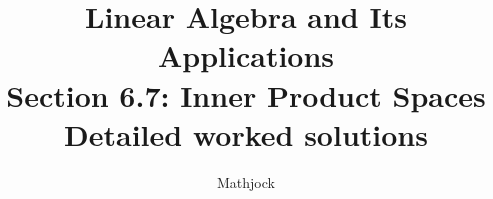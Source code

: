 
\title{\textbf{Linear Algebra and Its Applications}\\[0.3em]Section 6.7: Inner Product Spaces\\[0.3em]\large Detailed worked solutions}
\author{Mathjock}
\date{}

\maketitle
\bookinfo
\tableofcontents
\clearpage
\renewcommand{\thesection}{6.\arabic{section}}
\renewcommand{\theHsection}{6.\arabic{section}}
\setcounter{section}{6}


